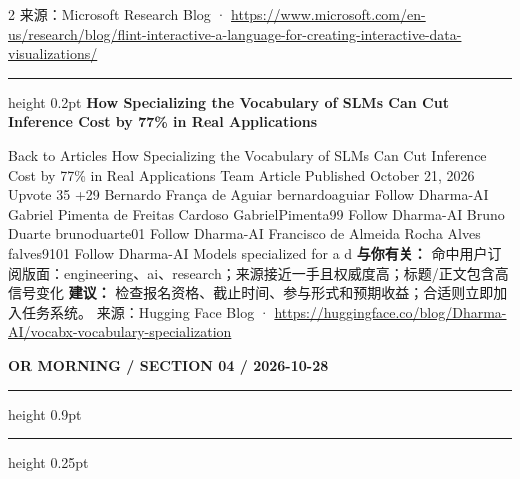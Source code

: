 \documentclass[10.5pt]{ctexart}
\begin{document}
\begin{multicols}{2}
{\footnotesize\color{ormuted} 来源：Microsoft Research Blog · \url{https://www.microsoft.com/en-us/research/blog/flint-interactive-a-language-for-creating-interactive-data-visualizations/}}
\vspace{2mm}
\hrule height 0.2pt
\vspace{2mm}
{\large\bfseries How Specializing the Vocabulary of SLMs Can Cut Inference Cost by 77\% in Real Applications}\par
Back to Articles How Specializing the Vocabulary of SLMs Can Cut Inference Cost by 77\% in Real Applications Team Article Published October 21, 2026 Upvote 35 +29 Bernardo França de Aguiar bernardoaguiar Follow Dharma-AI Gabriel Pimenta de Freitas Cardoso GabrielPimenta99 Follow Dharma-AI Bruno Duarte brunoduarte01 Follow Dharma-AI Francisco de Almeida Rocha Alves falves9101 Follow Dharma-AI Models specialized for a d
\textbf{与你有关：} 命中用户订阅版面：engineering、ai、research；来源接近一手且权威度高；标题/正文包含高信号变化
\textbf{建议：} 检查报名资格、截止时间、参与形式和预期收益；合适则立即加入任务系统。
{\footnotesize\color{ormuted} 来源：Hugging Face Blog · \url{https://huggingface.co/blog/Dharma-AI/vocabx-vocabulary-specialization}}
\end{multicols}
\newpage
{\small\bfseries OR MORNING / SECTION 04 / 2026-10-28}
\vspace{2mm}
\hrule height 0.9pt
\vspace{1.5mm}
\hrule height 0.25pt
\vspace{4mm}
\end{document}
